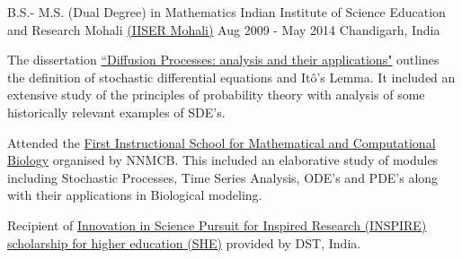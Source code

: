 \begin{cventries}
  \cventry
    {B.S.- M.S. (Dual Degree) in Mathematics}
    {Indian Institute of Science Education and Research Mohali \href{http://www.iisermohali.ac.in/}{(IISER Mohali)}}
    {Aug 2009 - May 2014}
    {Chandigarh, India}
    {
      \begin{cvitems}
      	\item {The dissertation \href{https://drive.google.com/file/d/0B4wz6CEEIK9OcXlBelJuY2ZGa09ZbEtnU1JNdVZxR01DUV9N/view?usp=sharing}{``Diffusion Processes: analysis and their applications"} outlines the definition of stochastic differential equations and It\^{o}'s Lemma. It included an extensive study of the principles of probability theory with analysis of some historically relevant examples of SDE's.}
      	\item {Attended the \href{http://www.iiserpune.ac.in/~mbio/?q=nnmcb/event/first-instructional-school-mathematical-and-computational-biology}{First Instructional School for Mathematical and Computational Biology} organised by NNMCB. This included an elaborative study of modules including Stochastic Processes, Time Series Analysis, ODE's and PDE's along with their applications in Biological modeling.}
        \item {Recipient of \href{http://www.inspire-dst.gov.in/SHE.html}{Innovation in Science Pursuit for Inspired Research (INSPIRE) scholarship for higher education (SHE)} provided by DST, India.}
      \end{cvitems}
    }
\end{cventries}

